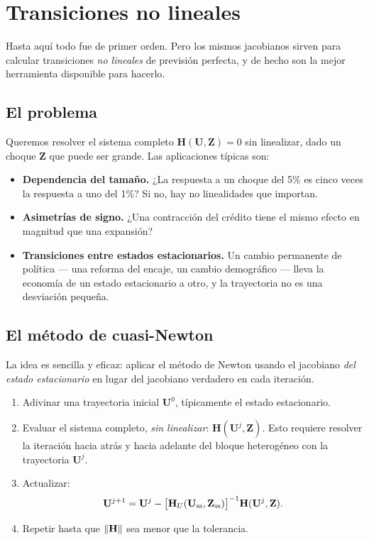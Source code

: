 \chapter{Transiciones no lineales}
\label{cap:nolineal}

Hasta aquí todo fue de primer orden. Pero los mismos jacobianos sirven para
calcular transiciones \emph{no lineales} de previsión perfecta, y de hecho son
la mejor herramienta disponible para hacerlo.

\section{El problema}

Queremos resolver el sistema completo $\mathbf{H}(\mathbf{U},\mathbf{Z}) = 0$
sin linealizar, dado un choque $\mathbf{Z}$ que puede ser grande. Las
aplicaciones típicas son:

\begin{itemize}[leftmargin=1.4em]
\item \textbf{Dependencia del tamaño.} ¿La respuesta a un choque del 5\% es cinco
veces la respuesta a uno del 1\%? Si no, hay no linealidades que importan.
\item \textbf{Asimetrías de signo.} ¿Una contracción del crédito tiene el mismo
efecto en magnitud que una expansión?
\item \textbf{Transiciones entre estados estacionarios.} Un cambio permanente de
política --- una reforma del encaje, un cambio demográfico --- lleva la economía
de un estado estacionario a otro, y la trayectoria no es una desviación pequeña.
\end{itemize}

\section{El método de cuasi-Newton}

La idea es sencilla y eficaz: aplicar el método de Newton usando el jacobiano
\emph{del estado estacionario} en lugar del jacobiano verdadero en cada iteración.

\begin{receta}
\begin{enumerate}[leftmargin=1.4em,itemsep=2pt]
\item Adivinar una trayectoria inicial $\mathbf{U}^0$, típicamente el estado
estacionario.
\item Evaluar el sistema completo, \emph{sin linealizar}:
$\mathbf{H}(\mathbf{U}^j, \mathbf{Z})$. Esto requiere resolver la iteración
hacia atrás y hacia adelante del bloque heterogéneo con la trayectoria
$\mathbf{U}^j$.
\item Actualizar:
\begin{equation}
\mathbf{U}^{j+1} = \mathbf{U}^j - \big[\mathbf{H}_U(\mathbf{U}_{\mathrm{ss}},\mathbf{Z}_{\mathrm{ss}})\big]^{-1}
\mathbf{H}(\mathbf{U}^j,\mathbf{Z}).
\label{eq:quasinewton}
\end{equation}
\item Repetir hasta que $\left\lVert \mathbf{H} \right\rVert$ sea menor que la tolerancia.
\end{enumerate}
\end{receta}

